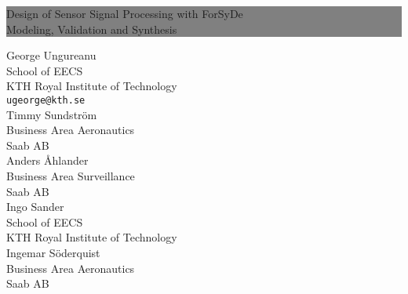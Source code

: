 \begin{titlepage} %
  
  
  \colorbox{grey}{
    \parbox[t]{0.93\textwidth}{ %
      \parbox[t]{0.91\textwidth}{ %
        \raggedleft %
        \fontsize{37pt}{60pt}\selectfont
        \vspace{0.7cm} %
        
        Design of Sensor Signal Processing with ForSyDe\\
        \fontsize{25pt}{60pt}\selectfont
        Modeling, Validation and Synthesis\\
        
        \vspace{0.7cm} %
      }
    }
  }
  
  \vfill %
  
  
  \parbox[t]{0.93\textwidth}{ %
    \raggedleft %
    {\Large George Ungureanu}\\[4pt] %
        School of EECS\\
        KTH Royal Institute of Technology\\[4pt] %
        \texttt{ugeorge@kth.se}\\[20pt]
    {\Large Timmy Sundstr\"{o}m}\\[4pt] %
        Business Area Aeronautics\\
        Saab AB\\[20pt]
    {\Large Anders \r{A}hlander}\\[4pt] %
        Business Area Surveillance\\
        Saab AB\\[20pt]
    {\Large Ingo Sander}\\[4pt] %
        School of EECS\\
        KTH Royal Institute of Technology\\[20pt]
    {\Large Ingemar S\"{o}derquist}\\[4pt] %
        Business Area Aeronautics\\
        Saab AB\\[4pt] %
        
}
\end{titlepage}
